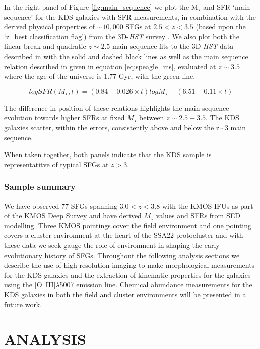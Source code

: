 \documentclass[fleqn,usenatbib]{mn2e}
\begin{document}
In the right panel of Figure \ref{fig:main_sequence} we plot the M$_{\star}$ and SFR `main sequence' for the KDS galaxies with SFR measurements, in combination with the derived physical properties of $\sim 10,000$ SFGs at $2.5 < z < 3.5$  (based upon the `z\_best classification flag') from the 3D-{\em HST} survey \citep{Brammer2012,Momcheva2016}.
We also plot both the linear-break and quadratic $z\sim 2.5$ main sequence fits to the 3D-{\em HST} data described in \cite{Whitaker2014} with the solid and dashed black lines as well as the main sequence relation described in \cite{Speagle2014} given in equation \ref{eq:speagle_ms}, evaluated at $z\sim3.5$ where the age of the universe is 1.77 Gyr, with the green line.

\begin{equation}\label{eq:speagle_ms}
logSFR(M_{\star}, t) = (0.84 - 0.026 \times t)logM_{\star} - (6.51 - 0.11 \times t)
\end{equation}

The difference in position of these relations highlights the main sequence evolution towards higher SFRs at fixed $M_{\star}$ between $z\sim2.5-3.5$.
The KDS galaxies scatter, within the errors, consistently above and below the z$\sim3$ main sequence.

When taken together, both panels indicate that the KDS sample is representatitve of typical SFGs at $z>3$.

\subsubsection{Sample summary}\label{subsubsec:sample_summary}
We have observed 77 SFGs spanning $3.0 < z < 3.8$ with the KMOS IFUs as part of the KMOS Deep Survey and have derived $M_{\star}$ values and SFRs from SED modelling.
Three KMOS pointings cover the field environment and one pointing covers a cluster environment at the heart of the SSA22 protocluster and with these data we seek gauge the role of environment in shaping the early evolutionary history of SFGs.
Throughout the following analysis sections we describe the use of high-resolution imaging to make morphological measurements for the KDS galaxies and the extraction of kinematic properties for the galaxies using the [O~{\sc III}]$\lambda$5007 emission line.
Chemical abundance measurements for the KDS galaxies in both the field and cluster environments will be presented in a future work.

\section{ANALYSIS}\label{sec:analysis}
\end{document}
